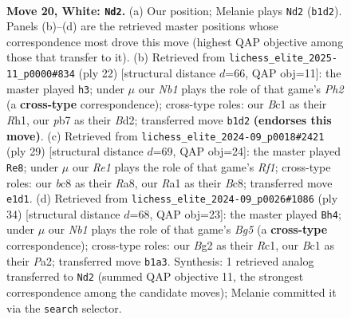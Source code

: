 \documentclass[11pt]{article}
\begin{document}
\clearpage

\begin{figure}[p]\centering
\begin{subfigure}{0.46\textwidth}\centering
\resizebox{\linewidth}{!}{%
\newchessgame
\chessboard[
  setfen={rnb3k1/1p2bpp1/pn1rp3/7p/8/1P2P1P1/P1p1P1BP/RNB1RK2 w - - 0 20},
  showmover=false,
  pgfstyle=straightmove, color=movearrow, markmove={b1-d2}
]}
\caption{}
\end{subfigure}\hfill
\begin{subfigure}{0.46\textwidth}\centering
\resizebox{\linewidth}{!}{%
\newchessgame
\chessboard[
  setfen={5b1r/ppkr1ppp/2n1pn2/2p5/2P5/2N3P1/PP1BPPBP/R2K3R w - - 2 12},
  showmover=false,
  pgfstyle=straightmove, color=movearrow, markmove={h2-h3}
]}
\caption{}
\end{subfigure}
\\[4pt]
\begin{subfigure}{0.46\textwidth}\centering
\resizebox{\linewidth}{!}{%
\newchessgame
\chessboard[
  setfen={r1bb1rk1/pp1n1ppp/2p5/3p4/3P2PP/1PP1NP2/1P6/R1B1K1NR b KQ - 0 15},
  showmover=false,
  pgfstyle=straightmove, color=movearrow, markmove={f8-e8}
]}
\caption{}
\end{subfigure}\hfill
\begin{subfigure}{0.46\textwidth}\centering
\resizebox{\linewidth}{!}{%
\newchessgame
\chessboard[
  setfen={2kr1b1r/pp4pp/5pb1/2pn2B1/6P1/2P4P/P2NPPB1/2R1K2R w K - 0 18},
  showmover=false,
  pgfstyle=straightmove, color=movearrow, markmove={g5-h4}
]}
\caption{}
\end{subfigure}
\caption{\textbf{Move 20, White: \texttt{Nd2}.} (a) Our position; Melanie plays \texttt{Nd2} (\texttt{b1d2}). Panels (b)--(d) are the retrieved master positions whose correspondence most drove this move (highest QAP objective among those that transfer to it). (b) Retrieved from \texttt{lichess\_elite\_2025-11\_p0000\#834} (ply 22) [structural distance $d$=66, QAP obj=11]: the master played \texttt{h3}; under $\mu$ our \emph{Nb1} plays the role of that game's \emph{Ph2} (a \textbf{cross-type} correspondence); cross-type roles: our \emph{B}c1 as their \emph{R}h1, our \emph{p}b7 as their \emph{B}d2; transferred move \texttt{b1d2} \textbf{(endorses this move)}. (c) Retrieved from \texttt{lichess\_elite\_2024-09\_p0018\#2421} (ply 29) [structural distance $d$=69, QAP obj=24]: the master played \texttt{Re8}; under $\mu$ our \emph{Re1} plays the role of that game's \emph{Rf1}; cross-type roles: our \emph{b}c8 as their \emph{R}a8, our \emph{R}a1 as their \emph{B}c8; transferred move \texttt{e1d1}. (d) Retrieved from \texttt{lichess\_elite\_2024-09\_p0026\#1086} (ply 34) [structural distance $d$=68, QAP obj=23]: the master played \texttt{Bh4}; under $\mu$ our \emph{Nb1} plays the role of that game's \emph{Bg5} (a \textbf{cross-type} correspondence); cross-type roles: our \emph{B}g2 as their \emph{R}c1, our \emph{B}c1 as their \emph{P}a2; transferred move \texttt{b1a3}. Synthesis: 1 retrieved analog transferred to \texttt{Nd2} (summed QAP objective 11, the strongest correspondence among the candidate moves); Melanie committed it via the \texttt{search} selector.}
\label{fig:thought-m38}
\end{figure}
\end{document}

